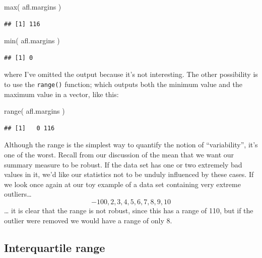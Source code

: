 \documentclass[
]{book}
\newenvironment{Shaded}{\begin{snugshade}}{\end{snugshade}}
\newcommand{\FunctionTok}[1]{\textcolor[rgb]{0.00,0.00,0.00}{#1}}
\newcommand{\NormalTok}[1]{#1}
\begin{document}
\begin{Shaded}
\begin{Highlighting}[]
\FunctionTok{max}\NormalTok{( afl.margins )}
\end{Highlighting}
\end{Shaded}

\begin{verbatim}
## [1] 116
\end{verbatim}

\begin{Shaded}
\begin{Highlighting}[]
\FunctionTok{min}\NormalTok{( afl.margins )}
\end{Highlighting}
\end{Shaded}

\begin{verbatim}
## [1] 0
\end{verbatim}

where I've omitted the output because it's not interesting. The other possibility is to use the \texttt{range()} function; which outputs both the minimum value and the maximum value in a vector, like this:

\begin{Shaded}
\begin{Highlighting}[]
\FunctionTok{range}\NormalTok{( afl.margins )}
\end{Highlighting}
\end{Shaded}

\begin{verbatim}
## [1]   0 116
\end{verbatim}

Although the range is the simplest way to quantify the notion of ``variability'', it's one of the worst. Recall from our discussion of the mean that we want our summary measure to be robust. If the data set has one or two extremely bad values in it, we'd like our statistics not to be unduly influenced by these cases. If we look once again at our toy example of a data set containing very extreme outliers\ldots{}
\[
-100,2,3,4,5,6,7,8,9,10
\]
\ldots{} it is clear that the range is not robust, since this has a range of 110, but if the outlier were removed we would have a range of only 8.

\hypertarget{interquartile-range}{%
\subsection{Interquartile range}\label{interquartile-range}}
\end{document}
